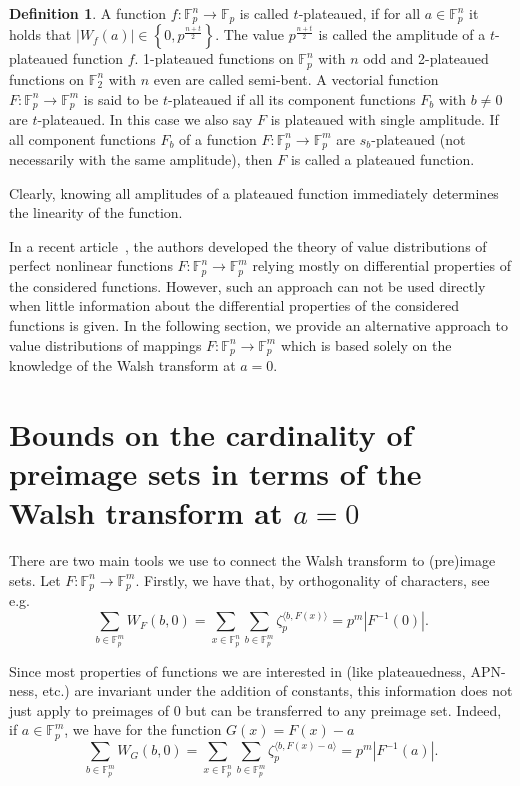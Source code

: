 \documentclass[11pt]{article}
\newcommand{\F}{\mathbb F}
\theoremstyle{plain}
\theoremstyle{definition}
\newtheorem{definition}[theorem]{Definition}
\numberwithin{theorem}{section}
\numberwithin{equation}{section}
\numberwithin{table}{section}
\numberwithin{figure}{section}
\begin{document}
{\begin{definition}
    A function $f\colon \mathbb{F}_p^n \rightarrow \mathbb{F}_p$ is called $t$-plateaued, if for all $a \in \mathbb{F}_p^n$  it holds that $\left|W_f(a)\right| \in\left\{0,p^{\frac{n+t}{2}}\right\}$. The value $p^{\frac{n+t}{2}}$ is called the amplitude of a $t$-plateaued function $f$. 1-plateaued functions on $\mathbb{F}_p^n$ with $n$ odd and 2-plateaued functions on $\mathbb{F}_2^n$ with $n$ even are called semi-bent. A vectorial function $F\colon \mathbb{F}_p^n \rightarrow \mathbb{F}_p^m$ is said to be $t$-plateaued if all its component functions $F_b$ with $b \neq 0$ are $t$-plateaued. In this case we also say $F$ is plateaued with single amplitude. If all component functions $F_b$ of a function $F\colon\F_p^n\to\F_p^m$ are $s_b$-plateaued (not necessarily with the same amplitude), then $F$ is called a plateaued function.
\end{definition}
Clearly, knowing all amplitudes of a plateaued function immediately determines the linearity of the function.

In a recent article~\cite{Koelsch2023}, the authors developed the theory of value distributions of perfect nonlinear functions $F\colon\F_p^n\to\F_p^m$ relying mostly on differential properties of the considered functions. However, such an approach can not be used directly when little information about the differential properties of the considered functions is given. In the following section, we provide an alternative approach to value distributions of mappings $F\colon\F_p^n\to\F_p^m$ which is based solely on the knowledge of the Walsh transform at $a=0$.

\section{Bounds on the cardinality of preimage sets in terms of the Walsh transform at $a=0$} \label{sec:walsh}

There are two main tools we use to connect the Walsh transform to (pre)image sets. Let $F \colon \F_p^n \rightarrow \F_p^m$. Firstly, we have that, by orthogonality of characters, see e.g.~\cite[Theorem 3.3.]{hou2018lectures}
\begin{equation} \label{eq:first}
    \sum_{b \in \F_{p}^m}W_F(b,0) = \sum_{x \in \F_{p}^n}\sum_{b \in \F_{p}^m} \zeta_p^{\langle b,F(x)\rangle} = p^m |F^{-1}(0)|.
\end{equation}

Since most properties of functions we are interested in (like plateauedness, APN-ness, etc.) are invariant under the addition of constants, this information does not just apply to preimages of $0$ but can be transferred to any preimage set. Indeed, if $a \in \F_p^m$, we have for the function $G(x)=F(x)-a$
\begin{equation*} 
    \sum_{b \in \F_{p}^m}W_{G}(b,0) = \sum_{x \in \F_{p}^n}\sum_{b \in \F_{p}^m} \zeta_p^{\langle b,F(x)-a\rangle} =p^m |F^{-1}(a)|.
\end{equation*}

}
\end{document}
